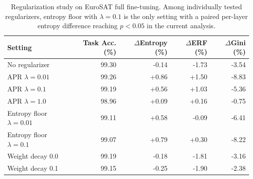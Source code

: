 \begin{table}[t]
\centering
\caption{Regularization study on EuroSAT full fine-tuning. Among individually tested regularizers, entropy floor with $\lambda=0.1$ is the only setting with a paired per-layer entropy difference reaching $p<0.05$ in the current analysis.}
\label{tab:regularization}
\small
\begin{tabular}{lrrrr}
\toprule
Setting & Task Acc. (\%) & $\Delta$Entropy (\%) & $\Delta$ERF (\%) & $\Delta$Gini (\%) \\
\midrule
No regularizer & 99.30 & -0.14 & -1.73 & -3.54 \\
APR $\lambda=0.01$ & 99.26 & +0.86 & +1.50 & -8.83 \\
APR $\lambda=0.1$ & 99.19 & +0.56 & +1.03 & -5.36 \\
APR $\lambda=1.0$ & 98.96 & +0.09 & +0.16 & -0.75 \\
Entropy floor $\lambda=0.01$ & 99.11 & +0.58 & -0.09 & -6.41 \\
Entropy floor $\lambda=0.1$ & 99.07 & +0.79 & +0.30 & -8.22 \\
Weight decay 0.0 & 99.19 & -0.18 & -1.81 & -3.16 \\
Weight decay 0.1 & 99.15 & -0.25 & -1.90 & -2.38 \\
\bottomrule
\end{tabular}
\end{table}
